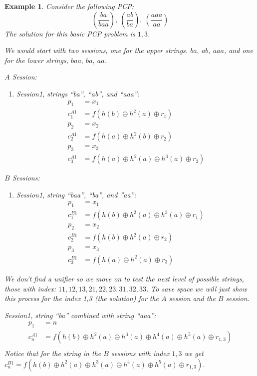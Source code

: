 \documentclass{easychair}
\newtheorem{example}{Example}
\begin{document}
{\begin{example}
		Consider the following PCP:
		\[
		(\frac{ba}{baa}),~(\frac{ab}{ba}),~(\frac{aaa}{aa})
		\]
		The solution for this basic PCP problem is $1,3$.
		
		We would start with two sessions, one for the 
		upper strings. $ba, ~ab, ~aaa$, and one for the lower
		strings, $baa, ~ba, ~aa$. 
		
		\noindent
		$A$ Session:
		\begin{enumerate}
			\item Session1, strings ``ba'', ``ab'', and ``aaa'':
			\begin{align*}
			p_1 &= x_1\\
			c^{A1}_1 &= f(h(b) \oplus h^2(a) \oplus r_1)\\
			p_2 &= x_2\\
			c^{A1}_2 &= f(h(a) \oplus h^2(b) \oplus r_2)\\
			p_3 &= x_3\\
			c^{A1}_3 &= f(h(a) \oplus h^2(a) \oplus h^3(a) \oplus r_3)
			\end{align*}
		\end{enumerate}
		
		\noindent
		$B$ Sessions:
		\begin{enumerate}
			\item Session1, string ``baa'', ``ba'', and ''aa'':
			\begin{align*}
			p_1 &= x_1\\
			c^{B1}_1 &= f(h(b) \oplus h^2(a) \oplus h^3(a) \oplus r_1)\\
			p_2 &= x_2\\
			c^{B1}_2 &= f(h(b) \oplus h^2(a) \oplus r_2)\\
			p_3 &= x_3\\
			c^{B1}_3 &= f(h(a) \oplus h^2(a) \oplus r_3)
			\end{align*}
		\end{enumerate}
		
		We don't find a unifier so we move on to test the next level of
		possible strings, those with index: $11, 12, 13, 21, 22, 23, 31, 32, 33$. To save space we will just show this process for 
		the index 1,3 (the solution) for the $A$ session and the 
		$B$ session.
		
		Session1, string ``ba'' combined with string ``aaa'':
		\begin{align*}
		p_1 &= n\\
		c^{A1}_n &= f(h(b) \oplus h^2(a) 
		\oplus h^3(a) \oplus h^4(a) \oplus h^5(a)
		 \oplus r_{1,3})\\
		\end{align*}
		Notice that for the string in the $B$ sessions with index $1,3$ we get
		$c^{B1}_n= f(h(b) \oplus h^2(a) 
		\oplus h^3(a) \oplus h^4(a) \oplus h^5(a)
		\oplus r_{1,3})$.
		

\end{example}}
\end{document}
